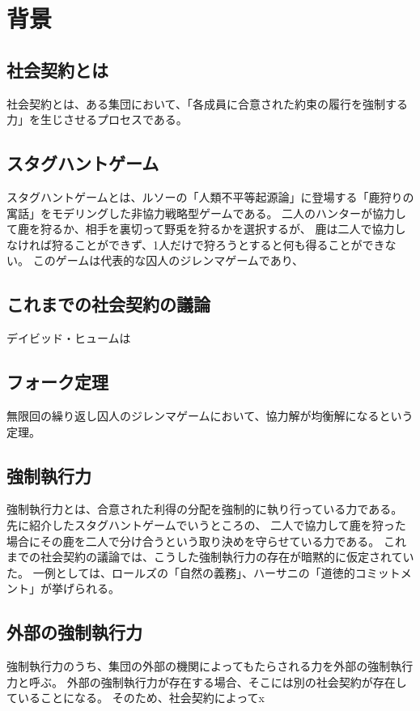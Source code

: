 \chapter{背景}
\section{社会契約とは}
社会契約とは、ある集団において、「各成員に合意された約束の履行を強制する力」を生じさせるプロセスである。

\section{スタグハントゲーム}

スタグハントゲームとは、ルソーの「人類不平等起源論」\cite{rousseau1999discourse}に登場する「鹿狩りの寓話」をモデリングした非協力戦略型ゲームである。\cite{skyrms2001}
二人のハンターが協力して鹿を狩るか、相手を裏切って野兎を狩るかを選択するが、
鹿は二人で協力しなければ狩ることができず、1人だけで狩ろうとすると何も得ることができない。
このゲームは代表的な囚人のジレンマゲームであり、

\section{これまでの社会契約の議論}
デイビッド・ヒュームは

\section{フォーク定理}
無限回の繰り返し囚人のジレンマゲームにおいて、協力解が均衡解になるという定理。

\section{強制執行力}
強制執行力とは、合意された利得の分配を強制的に執り行っている力である。
先に紹介したスタグハントゲームでいうところの、
二人で協力して鹿を狩った場合にその鹿を二人で分け合うという取り決めを守らせている力である。
これまでの社会契約の議論では、こうした強制執行力の存在が暗黙的に仮定されていた。
一例としては、ロールズの「自然の義務」、ハーサニの「道徳的コミットメント」が挙げられる。

\section{外部の強制執行力}
強制執行力のうち、集団の外部の機関によってもたらされる力を外部の強制執行力と呼ぶ。
外部の強制執行力が存在する場合、そこには別の社会契約が存在していることになる。
そのため、社会契約によってx

